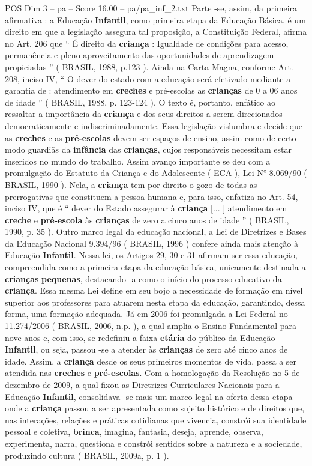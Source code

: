 \begin{textsample}{POS Dim 3 – pa – Score 16.00 – pa/pa\_inf\_2.txt}
Parte -se, assim, da primeira afirmativa : a Educação \textbf{Infantil}, como primeira etapa da Educação Básica, é um direito em que a legislação assegura tal proposição, a Constituição Federal, afirma no Art. 206 que “ É direito da \textbf{criança} : Igualdade de condições para acesso, permanência e pleno aproveitamento das oportunidades de aprendizagem propiciadas ” ( BRASIL, 1988, p.123 ).
Ainda na Carta Magna, conforme Art. 208, inciso IV, “ O dever do estado com a educação será efetivado mediante a garantia de : atendimento em \textbf{creches} e pré-escolas as \textbf{crianças} de 0 a 06 anos de idade ” ( BRASIL, 1988, p. 123-124 ).
O texto é, portanto, enfático ao ressaltar a importância da \textbf{criança} e dos seus direitos a serem direcionados democraticamente e indiscriminadamente.
Essa legislação vislumbra e decide que as \textbf{creches} e as \textbf{pré-escolas} devem ser espaços de ensino, assim como de certo modo guardiãs da \textbf{infância} das \textbf{crianças}, cujos responsáveis necessitam estar inseridos no mundo do trabalho.
Assim avanço importante se deu com a promulgação do Estatuto da Criança e do Adolescente ( ECA ), Lei N{\EmojiFont °} 8.069/90 ( BRASIL, 1990 ).
Nela, a \textbf{criança} tem por direito o gozo de todas as prerrogativas que constituem a pessoa humana e, para isso, enfatiza no Art. 54, inciso IV, que é “ dever do Estado assegurar à \textbf{criança} [... ] atendimento em \textbf{creche} e \textbf{pré-escola} às \textbf{crianças} de zero a cinco anos de idade ” ( BRASIL, 1990, p. 35 ).
Outro marco legal da educação nacional, a Lei de Diretrizes e Bases da Educação Nacional 9.394/96 ( BRASIL, 1996 ) confere ainda mais atenção à Educação \textbf{Infantil}.
Nessa lei, os Artigos 29, 30 e 31 afirmam ser essa educação, compreendida como a primeira etapa da educação básica, unicamente destinada a \textbf{crianças} \textbf{pequenas}, destacando -a como o início do processo educativo da \textbf{criança}.
Essa mesma Lei define em seu bojo a necessidade de formação em nível superior aos professores para atuarem nesta etapa da educação, garantindo, dessa forma, uma formação adequada.
Já em 2006 foi promulgada a Lei Federal no 11.274/2006 ( BRASIL, 2006, n.p. ), a qual amplia o Ensino Fundamental para nove anos e, com isso, se redefiniu a faixa \textbf{etária} do público da Educação \textbf{Infantil}, ou seja, passou -se a atender às \textbf{crianças} de zero até cinco anos de idade.
Assim, a \textbf{criança} desde os seus primeiros momentos de vida, passa a ser atendida nas \textbf{creches} e \textbf{pré-escolas}.
Com a homologação da Resolução no 5 de dezembro de 2009, a qual fixou as Diretrizes Curriculares Nacionais para a Educação \textbf{Infantil}, consolidava -se mais um marco legal na oferta dessa etapa onde a \textbf{criança} passou a ser apresentada como sujeito histórico e de direitos que, nas interações, relações e práticas cotidianas que vivencia, constrói sua identidade pessoal e coletiva, \textbf{brinca}, imagina, fantasia, deseja, aprende, observa, experimenta, narra, questiona e constrói sentidos sobre a natureza e a sociedade, produzindo cultura ( BRASIL, 2009a, p. 1 ).

\end{textsample}
